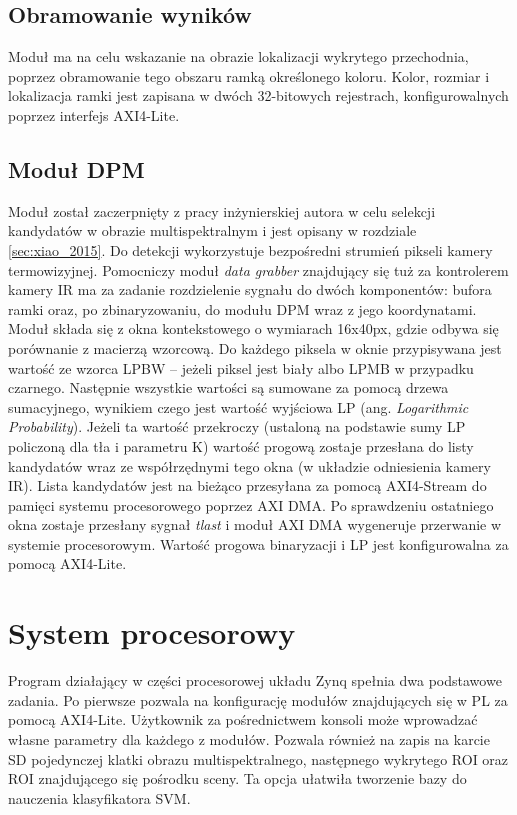 \subsection{Obramowanie wyników}
Moduł ma na celu wskazanie na obrazie lokalizacji wykrytego przechodnia, poprzez obramowanie tego obszaru ramką określonego koloru. Kolor, rozmiar i lokalizacja ramki jest zapisana w dwóch 32-bitowych rejestrach, konfigurowalnych poprzez interfejs AXI4-Lite.
\subsection{Moduł DPM}
Moduł został zaczerpnięty z pracy inżynierskiej autora w celu selekcji kandydatów w obrazie multispektralnym i jest opisany w rozdziale \ref {sec:xiao_2015}. Do detekcji wykorzystuje bezpośredni strumień pikseli kamery termowizyjnej. Pomocniczy moduł \textit{data grabber} znajdujący się tuż za kontrolerem kamery IR ma za zadanie rozdzielenie sygnału do dwóch komponentów: bufora ramki oraz, po zbinaryzowaniu, do modułu DPM wraz z jego koordynatami. Moduł składa się z okna kontekstowego o wymiarach 16x40px, gdzie odbywa się porównanie z macierzą wzorcową. Do każdego piksela w oknie przypisywana jest wartość ze wzorca LPBW – jeżeli piksel jest biały albo LPMB w przypadku czarnego. Następnie wszystkie wartości są sumowane za pomocą drzewa sumacyjnego, wynikiem czego jest wartość wyjściowa LP (ang. \textit{Logarithmic Probability}). Jeżeli ta wartość przekroczy (ustaloną na podstawie sumy LP policzoną dla tła i parametru K) wartość progową zostaje przesłana do listy kandydatów wraz ze współrzędnymi tego okna (w układzie odniesienia kamery IR). Lista kandydatów jest na bieżąco przesyłana za pomocą AXI4-Stream do pamięci systemu procesorowego poprzez AXI DMA. Po sprawdzeniu ostatniego okna zostaje przesłany sygnał \textit{tlast} i moduł AXI DMA wygeneruje przerwanie w systemie procesorowym. Wartość progowa binaryzacji i LP jest konfigurowalna za pomocą AXI4-Lite.
\section{System procesorowy}
Program działający w części procesorowej układu Zynq spełnia dwa podstawowe zadania. Po pierwsze pozwala na konfigurację modułów znajdujących się w PL za pomocą AXI4-Lite. Użytkownik za pośrednictwem konsoli może wprowadzać własne parametry dla każdego z modułów. Pozwala również na zapis na karcie SD pojedynczej klatki obrazu multispektralnego, następnego wykrytego ROI oraz ROI znajdującego się pośrodku sceny. Ta opcja ułatwiła tworzenie bazy do nauczenia klasyfikatora SVM.

